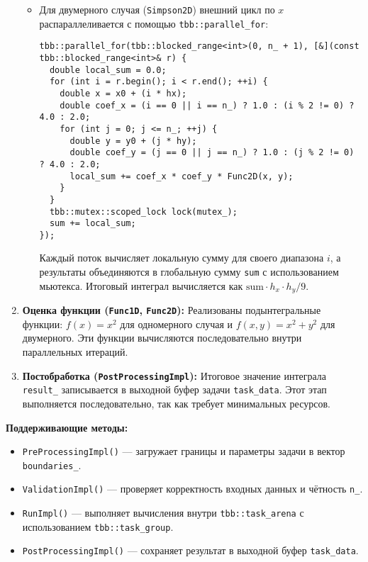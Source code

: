 \documentclass[12pt]{article}
\begin{document}
\begin{enumerate}
\begin{itemize}
    \item Для двумерного случая (\texttt{Simpson2D}) внешний цикл по $x$ распараллеливается с помощью \texttt{tbb::parallel\_for}:
    \begin{lstlisting}
tbb::parallel_for(tbb::blocked_range<int>(0, n_ + 1), [&](const tbb::blocked_range<int>& r) {
  double local_sum = 0.0;
  for (int i = r.begin(); i < r.end(); ++i) {
    double x = x0 + (i * hx);
    double coef_x = (i == 0 || i == n_) ? 1.0 : (i % 2 != 0) ? 4.0 : 2.0;
    for (int j = 0; j <= n_; ++j) {
      double y = y0 + (j * hy);
      double coef_y = (j == 0 || j == n_) ? 1.0 : (j % 2 != 0) ? 4.0 : 2.0;
      local_sum += coef_x * coef_y * Func2D(x, y);
    }
  }
  tbb::mutex::scoped_lock lock(mutex_);
  sum += local_sum;
});
    \end{lstlisting}
    Каждый поток вычисляет локальную сумму для своего диапазона $i$, а результаты объединяются в глобальную сумму \texttt{sum} с использованием мьютекса. Итоговый интеграл вычисляется как $\text{sum} \cdot h_x \cdot h_y / 9$.
  \end{itemize}

  \item \textbf{Оценка функции (\texttt{Func1D}, \texttt{Func2D}):}
  Реализованы подынтегральные функции: $f(x) = x^2$ для одномерного случая и $f(x, y) = x^2 + y^2$ для двумерного. Эти функции вычисляются последовательно внутри параллельных итераций.

  \item \textbf{Постобработка (\texttt{PostProcessingImpl}):}
  Итоговое значение интеграла \texttt{result\_} записывается в выходной буфер задачи \texttt{task\_data}. Этот этап выполняется последовательно, так как требует минимальных ресурсов.
\end{enumerate}

\textbf{Поддерживающие методы:}
\begin{itemize}
  \item \texttt{PreProcessingImpl()} --- загружает границы и параметры задачи в вектор \texttt{boundaries\_}.
  \item \texttt{ValidationImpl()} --- проверяет корректность входных данных и чётность \texttt{n\_}.
  \item \texttt{RunImpl()} --- выполняет вычисления внутри \texttt{tbb::task\_arena} с использованием \texttt{tbb::task\_group}.
  \item \texttt{PostProcessingImpl()} --- сохраняет результат в выходной буфер \texttt{task\_data}.
\end{itemize}
\end{document}
